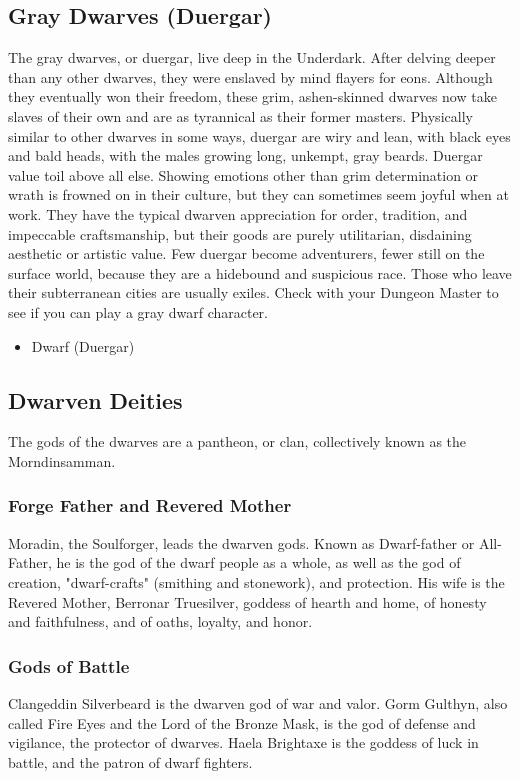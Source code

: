 \documentclass[10pt,a4paper,twoside,twocolumn,openany,bg=print,nodeprecatedcode]{dndbook}
\begin{document}
\subsection{Gray Dwarves (Duergar)}
The gray dwarves, or duergar, live deep in the Underdark. After delving deeper than any other dwarves, they were enslaved by mind flayers for eons. Although they eventually won their freedom, these grim, ashen-skinned dwarves now take slaves of their own and are as tyrannical as their former masters.
Physically similar to other dwarves in some ways, duergar are wiry and lean, with black eyes and bald heads, with the males growing long, unkempt, gray beards.
Duergar value toil above all else. Showing emotions other than grim determination or wrath is frowned on in their culture, but they can sometimes seem joyful when at work. They have the typical dwarven appreciation for order, tradition, and impeccable craftsmanship, but their goods are purely utilitarian, disdaining aesthetic or artistic value.
Few duergar become adventurers, fewer still on the surface world, because they are a hidebound and suspicious race. Those who leave their subterranean cities are usually exiles. Check with your Dungeon Master to see if you can play a gray dwarf character.

\begin{itemize}
\item Dwarf (Duergar)
\end{itemize}

\subsection{Dwarven Deities}
The gods of the dwarves are a pantheon, or clan, collectively known as the Morndinsamman.
\subsubsection{Forge Father and Revered Mother}
Moradin, the Soulforger, leads the dwarven gods. Known as Dwarf-father or All-Father, he is the god of the dwarf people as a whole, as well as the god of creation, "dwarf-crafts" (smithing and stonework), and protection. His wife is the Revered Mother, Berronar Truesilver, goddess of hearth and home, of honesty and faithfulness, and of oaths, loyalty, and honor.
\subsubsection{Gods of Battle}
Clangeddin Silverbeard is the dwarven god of war and valor. Gorm Gulthyn, also called Fire Eyes and the Lord of the Bronze Mask, is the god of defense and vigilance, the protector of dwarves. Haela Brightaxe is the goddess of luck in battle, and the patron of dwarf fighters.
\end{document}
